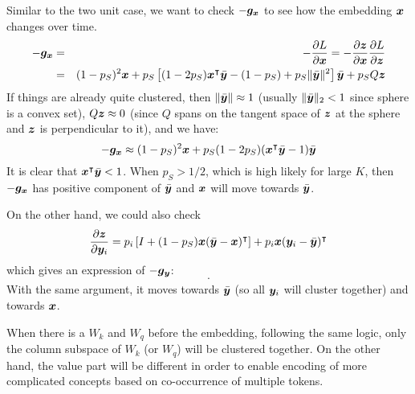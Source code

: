 Similar to the two unit case, we want to check $-{\bm{g}}_{\bm{x}}$ to see how the embedding ${\bm{x}}$ changes over time.
\begin{eqnarray}
    -{\bm{g}}_{\bm{x}} &=& -\frac{\partial L}{\partial {\bm{x}}} = -\frac{\partial {\bm{z}}}{\partial {\bm{x}}} \frac{\partial L}{\partial {\bm{z}}} \\
    &=& (1 - p_S)^2{\bm{x}} + p_S \left[(1-2p_S){\bm{x}}^\intercal\bar{{\bm{y}}} - (1 - p_S) + p_S \|\bar{{\bm{y}}}\|^2\right]\bar{{\bm{y}}} + p_S Q{\bm{z}} \nonumber 
\end{eqnarray}
If things are already quite clustered, then $\|\bar{{\bm{y}}}\| \approx 1$ (usually $\|\bar{{\bm{y}}}\|_2 < 1$ since sphere is a convex set), $Q{\bm{z}} \approx 0$ (since $Q$ spans on the tangent space of ${\bm{z}}$ at the sphere and ${\bm{z}}$ is perpendicular to it), and we have:
\begin{equation}
    -{\bm{g}}_{\bm{x}} \approx (1 - p_S)^2 {\bm{x}} + p_S(1-2p_S)({\bm{x}}^\intercal\bar{{\bm{y}}} - 1) \bar{{\bm{y}}}
\end{equation}
It is clear that ${\bm{x}}^\intercal\bar{{\bm{y}}} < 1$. When $p_S > 1/2$, which is high likely for large $K$, then $-{\bm{g}}_{\bm{x}}$ has positive component of $\bar{{\bm{y}}}$ and ${\bm{x}}$ will move towards $\bar{{\bm{y}}}$. 

On the other hand, we could also check
\begin{equation}
    \frac{\partial {\bm{z}}}{\partial {\bm{y}}_i} = p_i \left[I + (1 - p_S){\bm{x}} (\bar{{\bm{y}}} - {\bm{x}})^\intercal\right] + p_i {\bm{x}} ({\bm{y}}_i - \bar{{\bm{y}}})^\intercal
\end{equation}
which gives an expression of $-{\bm{g}}_{\bm{y}}$:
\begin{equation}
\cdot    
\end{equation}
With the same argument, it moves towards $\bar{{\bm{y}}}$ (so all ${\bm{y}}_i$ will cluster together) and towards ${\bm{x}}$. 

When there is a $W_k$ and $W_q$ before the embedding, following the same logic, only the column subspace of $W_k$ (or $W_q$) will be clustered together. On the other hand, the value part will be different in order to enable encoding of more complicated concepts based on co-occurrence of multiple tokens. 

\def\pr{\mathbb{P}}

